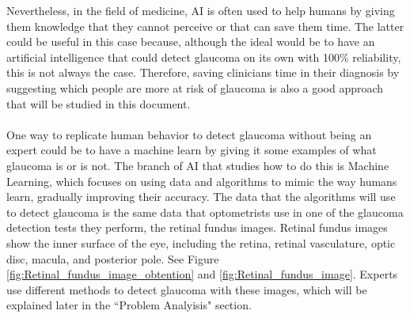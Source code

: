 \documentclass[11pt, a4paper]{article}
\begin{document}
Nevertheless, in the field of medicine, AI is often used to help humans by giving them knowledge that they cannot perceive or that can save them time. The latter could be useful in this case because, although the ideal would be to have an artificial intelligence that could detect glaucoma on its own with 100\% reliability, this is not always the case. Therefore, saving clinicians time in their diagnosis by suggesting which people are more at risk of glaucoma is also a good approach that will be studied in this document.
\\
\\
One way to replicate human behavior to detect glaucoma without being an expert could be to have a machine learn by giving it some examples of what glaucoma is or is not. The branch of AI that studies how to do this is Machine Learning, which focuses on using data and algorithms to mimic the way humans learn, gradually improving their accuracy. The data that the algorithms will use to detect glaucoma is the same data that optometrists use in one of the glaucoma detection tests they perform, the retinal fundus images. Retinal fundus images show the inner surface of the eye, including the retina, retinal vasculature, optic disc, macula, and posterior pole. See Figure \ref{fig:Retinal_fundus_image_obtention} and \ref{fig:Retinal_fundus_image}. Experts use different methods to detect glaucoma with these images, which will be explained later in the ``Problem Analyisis" section.
\end{document}
